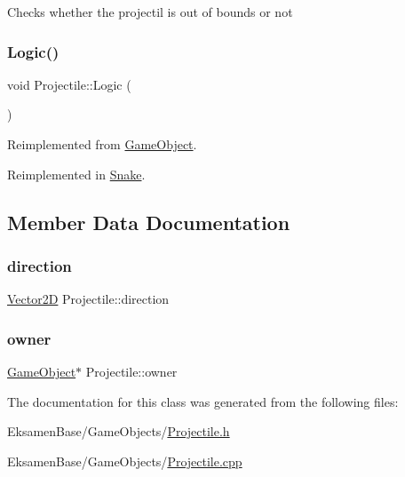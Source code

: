 Checks whether the projectil is out of bounds or not 

\mbox{\label{class_projectile_a871e265207d2bf2d5180152a7acf2d40}} 
\subsubsection{\texorpdfstring{Logic()}{Logic()}}
{\footnotesize\ttfamily void Projectile\+::\+Logic (\begin{DoxyParamCaption}{ }\end{DoxyParamCaption})\hspace{0.3cm}{\ttfamily [virtual]}}



Reimplemented from \mbox{\hyperlink{class_game_object_a79510ffc77339fe850491dce9f580fa9}{Game\+Object}}.



Reimplemented in \mbox{\hyperlink{class_snake_a1f01e21a73734f9c0d701ec02a9d2e41}{Snake}}.



\subsection{Member Data Documentation}
\mbox{\label{class_projectile_a0e4b335bd16e41ec9f8b2f6b8006cac8}} 
\subsubsection{\texorpdfstring{direction}{direction}}
{\footnotesize\ttfamily \mbox{\hyperlink{struct_game_object_1_1_vector2_d}{Vector2D}} Projectile\+::direction\hspace{0.3cm}{\ttfamily [protected]}}

\mbox{\label{class_projectile_a1a76b3677c7be9a072e7097c34adc517}} 
\subsubsection{\texorpdfstring{owner}{owner}}
{\footnotesize\ttfamily \mbox{\hyperlink{class_game_object}{Game\+Object}}$\ast$ Projectile\+::owner\hspace{0.3cm}{\ttfamily [protected]}}



The documentation for this class was generated from the following files\+:\begin{DoxyCompactItemize}
\item 
Eksamen\+Base/\+Game\+Objects/\mbox{\hyperlink{_projectile_8h}{Projectile.\+h}}\item 
Eksamen\+Base/\+Game\+Objects/\mbox{\hyperlink{_projectile_8cpp}{Projectile.\+cpp}}\end{DoxyCompactItemize}
